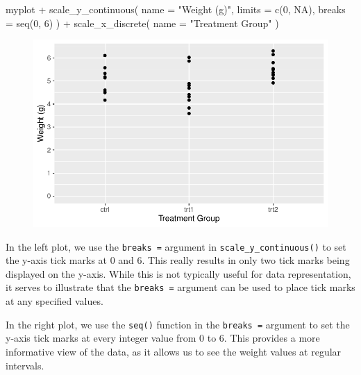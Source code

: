 \documentclass[
  letterpaper,
  DIV=11,
  numbers=noendperiod]{scrartcl}
\newenvironment{Shaded}{\begin{snugshade}}{\end{snugshade}}
\newcommand{\AttributeTok}[1]{\textcolor[rgb]{0.40,0.45,0.13}{#1}}
\newcommand{\ConstantTok}[1]{\textcolor[rgb]{0.56,0.35,0.01}{#1}}
\newcommand{\DecValTok}[1]{\textcolor[rgb]{0.68,0.00,0.00}{#1}}
\newcommand{\FunctionTok}[1]{\textcolor[rgb]{0.28,0.35,0.67}{#1}}
\newcommand{\NormalTok}[1]{\textcolor[rgb]{0.00,0.23,0.31}{#1}}
\newcommand{\SpecialCharTok}[1]{\textcolor[rgb]{0.37,0.37,0.37}{#1}}
\newcommand{\StringTok}[1]{\textcolor[rgb]{0.13,0.47,0.30}{#1}}
\begin{document}
\begin{Shaded}
\begin{Highlighting}[]
\NormalTok{myplot }\SpecialCharTok{+}
  \FunctionTok{scale\_y\_continuous}\NormalTok{(}
    \AttributeTok{name =} \StringTok{"Weight (g)"}\NormalTok{,}
    \AttributeTok{limits =} \FunctionTok{c}\NormalTok{(}\DecValTok{0}\NormalTok{, }\ConstantTok{NA}\NormalTok{),}
    \AttributeTok{breaks =} \FunctionTok{seq}\NormalTok{(}\DecValTok{0}\NormalTok{, }\DecValTok{6}\NormalTok{)}
\NormalTok{  ) }\SpecialCharTok{+}
  \FunctionTok{scale\_x\_discrete}\NormalTok{(}
    \AttributeTok{name =} \StringTok{"Treatment Group"}
\NormalTok{  )}
\end{Highlighting}
\end{Shaded}

\begin{figure}[H]

{\centering \includegraphics{ggplot2intro_files/figure-pdf/unnamed-chunk-11-1.pdf}

}

\end{figure}

In the left plot, we use the \texttt{breaks\ =} argument in
\texttt{scale\_y\_continuous()} to set the y-axis tick marks at 0 and 6.
This really results in only two tick marks being displayed on the
y-axis. While this is not typically useful for data representation, it
serves to illustrate that the \texttt{breaks\ =} argument can be used to
place tick marks at any specified values.

In the right plot, we use the \texttt{seq()} function in the
\texttt{breaks\ =} argument to set the y-axis tick marks at every
integer value from 0 to 6. This provides a more informative view of the
data, as it allows us to see the weight values at regular intervals.
\end{document}
